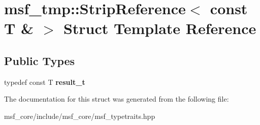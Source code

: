 \hypertarget{structmsf__tmp_1_1StripReference_3_01const_01T_01_6_01_4}{\section{msf\-\_\-tmp\-:\-:Strip\-Reference$<$ const T \& $>$ Struct Template Reference}
\label{structmsf__tmp_1_1StripReference_3_01const_01T_01_6_01_4}
}
\subsection*{Public Types}
\begin{DoxyCompactItemize}
\item 
\hypertarget{structmsf__tmp_1_1StripReference_3_01const_01T_01_6_01_4_a3f0da0790a8e34e58f4961f09c76a840}{typedef const T {\bfseries result\-\_\-t}}\label{structmsf__tmp_1_1StripReference_3_01const_01T_01_6_01_4_a3f0da0790a8e34e58f4961f09c76a840}

\end{DoxyCompactItemize}


The documentation for this struct was generated from the following file\-:\begin{DoxyCompactItemize}
\item 
msf\-\_\-core/include/msf\-\_\-core/msf\-\_\-typetraits.\-hpp\end{DoxyCompactItemize}
